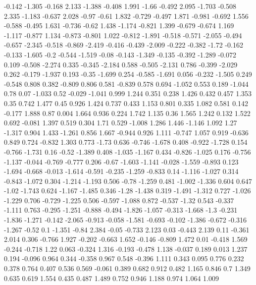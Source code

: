 { -0.142 -1.305 -0.168  2.133 -1.388 -0.408  1.991 -1.66  -0.492  2.095
 -1.703 -0.508  2.335 -1.183 -0.637  2.028 -0.97  -0.61   1.832 -0.729
 -0.497  1.871 -0.981 -0.692  1.556 -0.588 -0.495  1.631 -0.736 -0.62
  1.438 -1.174 -0.821  1.399 -0.679 -0.674  1.169 -1.117 -0.877  1.134
 -0.873 -0.801  1.022 -0.812 -1.891 -0.518 -0.571 -2.055 -0.494 -0.657
 -2.345 -0.518 -0.869 -2.419 -0.416 -0.439 -2.009 -0.222 -0.382 -1.72
 -0.162 -0.133 -1.605 -0.2   -0.544 -1.519 -0.08  -0.143 -1.349 -0.135
 -0.392 -1.289 -0.072  0.109 -0.508 -2.274  0.335 -0.345 -2.184  0.588
 -0.505 -2.131  0.786 -0.399 -2.029  0.262 -0.179 -1.937  0.193 -0.35
 -1.699  0.254 -0.585 -1.691  0.056 -0.232 -1.505  0.249 -0.548  0.808
  0.382 -0.809  0.806  0.581 -0.839  0.578  0.694 -1.052  0.553  0.189
 -1.044  0.78   0.07  -1.033  0.52  -0.029 -1.041  0.999  1.244  0.351
  0.238  1.426  0.432  0.457  1.353  0.35   0.742  1.477  0.45   0.926
  1.424  0.737  0.433  1.153  0.801  0.335  1.082  0.581  0.142 -0.177
  1.888  0.87   0.004  1.664  0.936  0.224  1.742  1.135  0.36   1.565
  1.242  0.132  1.522  0.692 -0.081  1.397  0.519  0.304  1.71   0.529
 -1.008  1.286  1.446 -1.146  1.092  1.27  -1.317  0.904  1.433 -1.261
  0.856  1.667 -0.944  0.926  1.111 -0.747  1.057  0.919 -0.636  0.849
  0.724 -0.832  1.303  0.773 -1.73   0.636 -0.746 -1.678  0.408 -0.922
 -1.728  0.154 -0.766 -1.731  0.16  -0.52  -1.389  0.408 -1.035 -1.167
  0.434 -0.826 -1.025  0.176 -0.756 -1.137 -0.044 -0.769 -0.777  0.206
 -0.67  -1.603 -1.141 -0.028 -1.559 -0.893  0.123 -1.694 -0.668 -0.013
 -1.614 -0.591 -0.235 -1.259 -0.833  0.14  -1.116 -1.027  0.314 -0.843
 -1.072  0.304 -1.214 -1.193  0.506 -0.78  -1.259  0.481 -1.002 -1.336
  0.604  0.647 -1.02  -1.743  0.624 -1.167 -1.485  0.346 -1.28  -1.438
  0.319 -1.491 -1.312  0.727 -1.026 -1.229  0.706 -0.729 -1.225  0.506
 -0.597 -1.088  0.872 -0.537 -1.32   0.543 -0.337 -1.111  0.763 -0.295
 -1.251 -0.888 -0.494 -1.826 -1.057 -0.313 -1.668 -1.3   -0.231 -1.836
 -1.271 -0.142 -2.065 -0.913 -0.058 -1.581 -0.693 -0.102 -1.386 -0.672
 -0.316 -1.267 -0.52   0.1   -1.351 -0.84   2.384 -0.05  -0.733  2.123
  0.03  -0.443  2.139  0.11  -0.361  2.014  0.306 -0.766  1.927 -0.202
 -0.663  1.652 -0.146 -0.809  1.472  0.01  -0.418  1.569 -0.244 -0.718
  1.22   0.063 -0.324  1.316 -0.193 -0.478  1.138 -0.037  0.189  0.013
  1.237  0.194 -0.096  0.964  0.344 -0.358  0.967  0.548 -0.396  1.111
  0.343  0.095  0.776  0.232  0.378  0.764  0.407  0.536  0.569 -0.061
  0.389  0.682  0.912  0.482  1.165  0.846  0.7    1.349  0.635  0.619
  1.554  0.435  0.487  1.489  0.752  0.946  1.188  0.974  1.064  1.009
}
